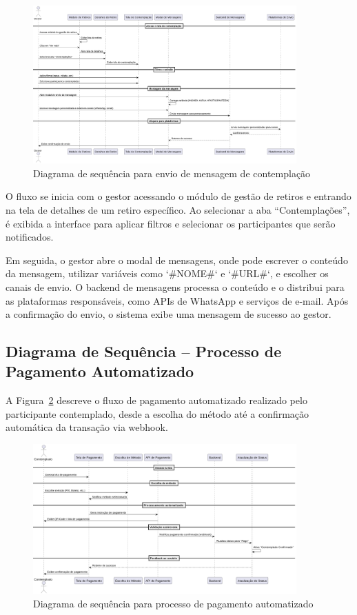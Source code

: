 \begin{figure}[H]
    \centering
    \includegraphics[width=0.9\textwidth]{images/diagramasdesequencias/manualContemplationMessage.png}
    \caption{Diagrama de sequência para envio de mensagem de contemplação}
    \label{fig:contemplationMessageSend}
\end{figure}

O fluxo se inicia com o gestor acessando o módulo de gestão de retiros e entrando na tela de detalhes de um retiro específico. Ao selecionar a aba “Contemplações”, é exibida a interface para aplicar filtros e selecionar os participantes que serão notificados.

Em seguida, o gestor abre o modal de mensagens, onde pode escrever o conteúdo da mensagem, utilizar variáveis como `\#NOME\#` e `\#URL\#`, e escolher os canais de envio. O backend de mensagens processa o conteúdo e o distribui para as plataformas responsáveis, como APIs de WhatsApp e serviços de e-mail. Após a confirmação do envio, o sistema exibe uma mensagem de sucesso ao gestor.

\subsection{Diagrama de Sequência – Processo de Pagamento Automatizado}

A Figura~\ref{fig:participantPaymentAuto} descreve o fluxo de pagamento automatizado realizado pelo participante contemplado, desde a escolha do método até a confirmação automática da transação via webhook.

\begin{figure}[H]
    \centering
    \includegraphics[width=0.9\textwidth]{images/diagramasdesequencias/participantPayment.png}
    \caption{Diagrama de sequência para processo de pagamento automatizado}
    \label{fig:participantPaymentAuto}
\end{figure}


